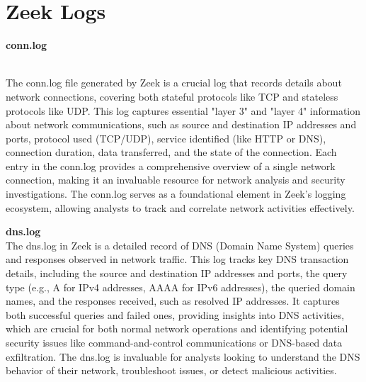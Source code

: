 \section{Zeek Logs}

\large\textbf{conn.log}
\vspace{5pt}

\\
\normalsize
The \colorbox{gray!20}{conn.log} file generated by Zeek is a crucial log that records details about network connections, covering both stateful protocols like TCP and stateless protocols like UDP. This log captures essential "layer 3" and "layer 4" information about network communications, such as source and destination IP addresses and ports, protocol used (TCP/UDP), service identified (like HTTP or DNS), connection duration, data transferred, and the state of the connection. Each entry in the \colorbox{gray!20}{conn.log} provides a comprehensive overview of a single network connection, making it an invaluable resource for network analysis and security investigations. The \colorbox{gray!20}{conn.log} serves as a foundational element in Zeek's logging ecosystem, allowing analysts to track and correlate network activities effectively.
\\
\vspace{1cm}

\noindent \Large \textbf{dns.log}
\vspace{5pt}
\\
\normalsize
The \colorbox{gray!20}{dns.log} in Zeek is a detailed record of DNS (Domain Name System) queries and
responses observed in network traffic. This log tracks key DNS transaction details, including the source and destination IP addresses and ports, the query type (e.g., A for IPv4 addresses, AAAA for IPv6 addresses), the queried domain names, and the responses received, such as resolved IP addresses. It captures both successful queries and failed ones, providing insights into DNS activities, which are crucial for both normal network operations and identifying potential security issues like command-and-control communications or DNS-based data exfiltration. The \colorbox{gray!20}{dns.log} is invaluable for analysts looking to understand the DNS behavior of their network, troubleshoot issues, or detect malicious activities.
\\
\vspace{1cm}

